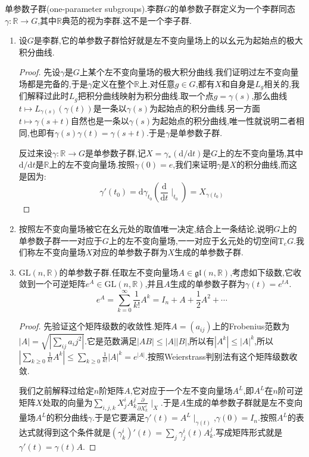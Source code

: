 单参数子群(one-parameter subgroups).李群$G$的单参数子群定义为一个李群同态$\gamma:\mathbb{R}\to G$,其中$\mathbb{R}$典范的视为李群.这不是一个李子群.
\begin{enumerate}
	\item 设$G$是李群,它的单参数子群恰好就是左不变向量场上的以幺元为起始点的极大积分曲线.
	\begin{proof}
		
		先设$\gamma$是$G$上某个左不变向量场的极大积分曲线.我们证明过左不变向量场都是完备的,于是$\gamma$定义在整个$\mathbb{R}$上.对任意$g\in G$,都有$X$和自身是$L_g$相关的,我们解释过此时$L_g$把积分曲线映射为积分曲线.取一个点$g=\gamma(s)$,那么曲线$t\mapsto L_{\gamma(s)}(\gamma(t))$是一条以$\gamma(s)$为起始点的积分曲线.另一方面$t\mapsto\gamma(s+t)$自然也是一条以$\gamma(s)$为起始点的积分曲线,唯一性就说明二者相同,也即有$\gamma(s)\gamma(t)=\gamma(s+t)$.于是$\gamma$是单参数子群.
		
		反过来设$\gamma:\mathbb{R}\to G$是单参数子群,记$X=\gamma_*(\mathrm{d}/\mathrm{d}t)$是$G$上的左不变向量场,其中$\mathrm{d}/\mathrm{d}t$是$\mathbb{R}$上的左不变向量场.按照$\gamma(0)=e$,我们来证明$\gamma$是$X$的积分曲线,而这是因为:
		$$\gamma'(t_0)=\mathrm{d}\gamma_{t_0}\left(\frac{\mathrm{d}}{\mathrm{d}t}\mid_{t_0}\right)=X_{\gamma(t_0)}$$
	\end{proof}
    \item 按照左不变向量场被它在幺元处的取值唯一决定,结合上一条结论,说明$G$上的单参数子群一一对应于$G$上的左不变向量场,一一对应于幺元处的切空间$\mathrm{T}_eG$.我们称左不变向量场$X$对应的单参数子群为$X$生成的单参数子群.
    \item $\mathrm{GL}(n,\mathbb{R})$的单参数子群.任取左不变向量场$A\in\mathfrak{gl}(n,\mathbb{R})$,考虑如下级数,它收敛到一个可逆矩阵$e^A\in\mathrm{GL}(n,\mathbb{R})$,并且$A$生成的单参数子群为$\gamma(t)=e^{tA}$.
    $$e^A=\sum_{k=0}^{\infty}\frac{1}{k!}A^k=I_n+A+\frac{1}{2}A^2+\cdots$$
    \begin{proof}
    	
    	先验证这个矩阵级数的收敛性.矩阵$A=(a_{ij})$上的Frobenius范数为$|A|=\sqrt{|\sum_{ij}a_ij^2|}$.它是范数满足$|AB|\le|A||B|$,所以有$|A^k|\le|A|^k$,所以$|\sum_{k\ge0}\frac{1}{k!}A^k|\le\sum_{k\ge0}\frac{1}{k!}|A|^k=e^{|A|}$.按照Weierstrass判别法有这个矩阵级数收敛.
    	
    	我们之前解释过给定$n$阶矩阵$A$,它对应于一个左不变向量场$A^L$,即$A^L$在$n$阶可逆矩阵$X$处取的向量为$\sum_{i,j,k}X_j^iA_k^j\frac{\partial}{\partial X_k^i}\mid_X$.于是$A$生成的单参数子群就是左不变向量场$A^L$的积分曲线$\gamma$.于是它要满足$\gamma'(t)=A^L\mid_{\gamma(t)}$,$\gamma(0)=I_n$.按照$A^L$的表达式就得到这个条件就是$(\gamma_k^i)'(t)=\sum_j\gamma_j^i(t)A_k^j$.写成矩阵形式就是$\gamma'(t)=\gamma(t)A$.
    	

\end{proof}
\end{enumerate}

